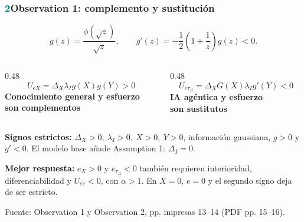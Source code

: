 \documentclass[12pt,aspectratio=169]{beamer}
\newcommand{\sourceLine}[1]{\vfill{\scriptsize\color{Muted}Fuente: #1\par}}
\begin{document}
\begin{frame}
  \frametitle{\textcolor{Teal}{2}\quad Observation 1: complemento y sustitución}

  {\small
  \[
  g(z)=\frac{\phi(\sqrt z)}{\sqrt z},
  \qquad
  g'(z)=-\frac{1}{2}\left(1+\frac{1}{z}\right)g(z)<0 .
  \]}

  \begin{columns}[T,onlytextwidth]
    \begin{column}{0.48\textwidth}
      \centering
      {\large
      \[
      U_{eX}=\Delta_X\lambda_I g(X)g(Y)>0
      \]}
      {\color{Teal}\bfseries Conocimiento general y esfuerzo\\son complementos}
    \end{column}
    \begin{column}{0.48\textwidth}
      \centering
      {\large
      \[
      U_{e\tau_A}=\Delta_XG(X)\lambda_I g'(Y)<0
      \]}
      {\color{Teal}\bfseries IA agéntica y esfuerzo\\son sustitutos}
    \end{column}
  \end{columns}

  \vspace{0.10cm}
  {\small
  {\bfseries Signos estrictos:}
  \(\Delta_X>0,\ \lambda_I>0,\ X>0,\ Y>0\), información gaussiana, \(g>0\) y \(g'<0\).
  El modelo base añade Assumption 1: \(\Delta_I=0\).

  \vspace{0.08cm}
  {\bfseries Mejor respuesta:}
  \(e_X>0\) y \(e_{\tau_A}<0\) también requieren interioridad, diferenciabilidad y \(U_{ee}<0\), con \(\alpha>1\).
  En \(X=0\), \(e=0\) y el segundo signo deja de ser estricto.\par}

  \sourceLine{Observation 1 y Observation 2, pp. impresas 13--14 (PDF pp. 15--16).}
\end{frame}
\end{document}
